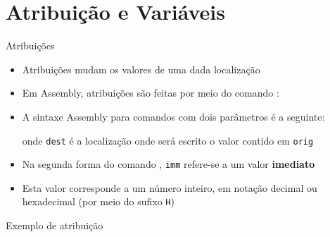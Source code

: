 \section{Atribuição e Variáveis}

\begin{frame}[fragile]{Atribuições}

    \begin{itemize}
        \item Atribuições mudam os valores de uma dada localização

        \item Em Assembly, atribuições são feitas por meio do comando :


        \item A sintaxe Assembly para comandos com dois parâmetros é a seguinte:
    

        onde \texttt{dest} é a localização onde será escrito o valor contido em \texttt{orig}

        \item Na segunda forma do comando , \texttt{imm} refere-se a um valor
            \textbf{imediato}

        \item Esta valor corresponde a um número inteiro, em notação decimal ou hexadecimal (por
            meio do sufixo \texttt{H})

    \end{itemize}

\end{frame}

\begin{frame}[fragile]{Exemplo de atribuição}
\end{frame}

